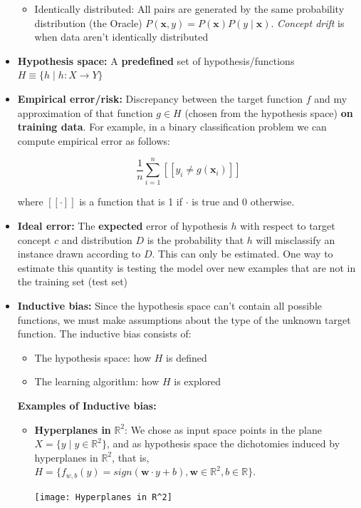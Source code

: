 \begin{itemize}
\begin{itemize}
    \item Identically distributed: All pairs are generated by the same probability distribution (the Oracle) $P(\textbf{x},y) = P(\textbf{x})P(y\mid \textbf{x})$. \textit{Concept drift} is when data aren't identically distributed
\end{itemize}
\item \textbf{Hypothesis space:}
A \textbf{predefined} set of hypothesis/functions $H \equiv \{h\mid h:X \rightarrow Y\}$

\item \textbf{Empirical error/risk:}
Discrepancy between the target function $f$ and my approximation of that function $g \in H$ (chosen from the hypothesis space) \textbf{on training data}. For example, in a binary classification problem we can compute empirical error as follows:
\begin{center}
    \[\frac{1}{n}\sum_{i=1}^{n} [\![y_{i}\neq g(\textbf{x}_{i})]\!]\]
\end{center}
where $[\![\cdot]\!]$ is a function that is 1 if $\cdot$ is true and 0 otherwise.

\item \textbf{Ideal error:}
The \textbf{expected} error of hypothesis $h$ with respect to target concept $c$ and distribution $D$ is the probability that $h$ will misclassify an instance drawn according to $D$. This can only be estimated. One way to estimate this quantity is testing the model over new examples that are not in the training set (test set) 

\item \textbf{Inductive bias:}
Since the hypothesis space can't contain all possible functions, we must make assumptions about the type of the unknown target function. The inductive bias consists of:
\begin{itemize}
    \item The hypothesis space: how $H$ is defined
    \item The learning algorithm: how $H$ is explored
\end{itemize}
\textbf{Examples of Inductive bias:}
\begin{itemize}
    \item \textbf{Hyperplanes in} $\mathbb{R}^{2}$: We chose as input space points in the plane $X = \{y\mid y \in \mathbb{R}^{2}\}$, and as hypothesis space the dichotomies induced by hyperplanes in $\mathbb{R}^{2}$, that is, $H = \{f_{w,b}(y) = sign(\textbf{w} \cdot y + b), \textbf{w} \in \mathbb{R}^{2}, b \in\mathbb{R}\}$.
    \begin{center}
        \texttt{[image: Hyperplanes in R^2]}
    \end{center}


\end{itemize}
\end{itemize}
